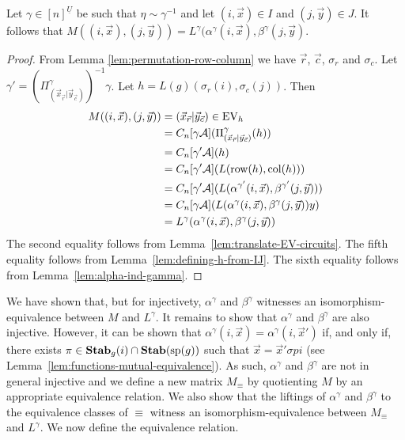 \documentclass[../paper.tex]{subfiles}
\begin{document}
\begin{thm}
	Let $\gamma\in [n]^{\underline{U}}$ be such that $\eta \sim \gamma^{-1}$ and
	let $(i, \vec{x})\in I$ and $(j, \vec{y})\in J$. It follows that $M((i,
	\vec{x}), (j, \vec{y})) = L^{\gamma}(\alpha^{\gamma}(i, \vec{x}),
	\beta^{\gamma}(j, \vec{y})$.
	\label{lem:ML-equal-elements}
\end{thm}
\begin{proof}
	From Lemma \ref{lem:permutation-row-column} we have $\vec{r}$, $\vec{c}$,
	$\sigma_r$ and $\sigma_c$. Let $\gamma' = (\Pi^{\gamma}_{(\vec{x}_{\vec{r}}
		\vert \vec{y}_{\vec{c}})})^{-1} \gamma$. Let $h = L(g)(\sigma_r(i),
	\sigma_c(j))$. Then
	\begin{align*}
		M((i, \vec{x}), (j, \vec{y}))
		  & = (\vec{x}_{\vec{r}} \vert \vec{y}_{\vec{c}}) \in \text{EV}_h                                    \\
		  & = C_n[\gamma \mathcal{A}] (\Pi^{\gamma}_{(\vec{x}_{\vec{r}} \vert \vec{y}_{\vec{c}})} (h)) \\
		  & = C_n[\gamma' \mathcal{A}] (h)                                                             \\
		  & = C_n[\gamma' \mathcal{A}](L(\text{row}(h), \text{col} (h)))                                        \\
		  & = C_n[\gamma' \mathcal{A}](L(\alpha^{\gamma'}(i, \vec{x}), \beta^{\gamma'}(j, \vec{y})))   \\
		  & = C_n[\gamma \mathcal{A}](L(\alpha^{\gamma}(i, \vec{x}), \beta^{\gamma}(j, \vec{y}))y)     \\
		  & = L^{\gamma}(\alpha^{\gamma}(i, \vec{x}), \beta^{\gamma}(j, \vec{y}))                      
	\end{align*}
	The second equality follows from Lemma~\ref{lem:translate-EV-circuits}. The
	fifth equality follows from Lemma~\ref{lem:defining-h-from-IJ}. The sixth
	equality follows from Lemma~\ref{lem:alpha-ind-gamma}.
\end{proof}

We have shown that, but for injectivety, $\alpha^{\gamma}$ and $\beta^{\gamma}$
witnesses an isomorphism-equivalence between $M$ and $L^{\gamma}$. It remains to
show that $\alpha^{\gamma}$ and $\beta^{\gamma}$ are also injective. However, it
can be shown that $\alpha^{\gamma}(i, \vec{x}) = \alpha^{\gamma}(i, \vec{x}')$
if, and only if, there exists $\pi \in \text{\textbf{Stab}}_g(i) \cap \text{\textbf{Stab}} (\text{sp} (g))$ such that
$\vec{x} = \vec{x}'\sigma pi$ (see Lemma~\ref{lem:functions-mutual-equivalence}). As such, $\alpha^{\gamma}$ and $\beta^{\gamma}$ are not in general injective and
we define a new matrix $M_{\equiv}$ by quotienting $M$ by an appropriate
equivalence relation. We also show that the liftings of $\alpha^{\gamma}$ and
$\beta^{\gamma}$ to the equivalence classes of $\equiv$ witness an
isomorphism-equivalence between $M_\equiv$ and $L^{\gamma}$. We now define the
equivalence relation.
\end{document}
